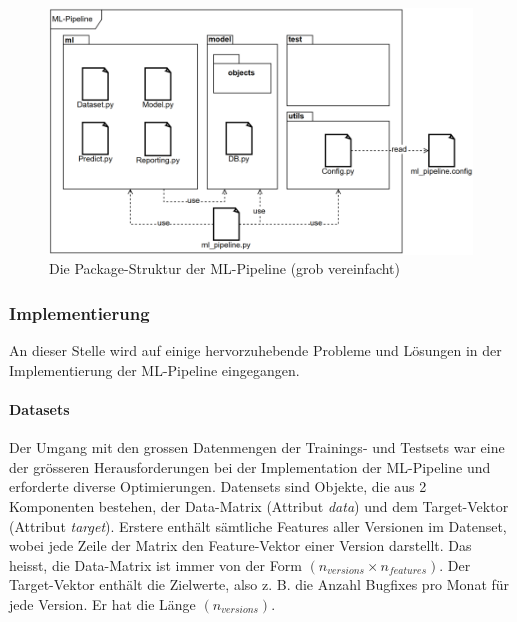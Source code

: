 \documentclass[10pt, a4paper]{article}
\begin{document}
\begin{figure}[h]
	\centering
	\includegraphics[width=1\linewidth]{resources/images/ml_pipeline_packages}
	\caption[Packages der ML-Pipeline]{Die Package-Struktur der ML-Pipeline (grob vereinfacht)}
	\label{fig:ml_pipeline_packages}
\end{figure}

\subsubsection{Implementierung} \label{sec:ml_pipeline_implementation}
An dieser Stelle wird auf einige hervorzuhebende Probleme und Lösungen in der Implementierung der ML-Pipeline eingegangen.

\paragraph{Datasets} Der Umgang mit den grossen Datenmengen der Trainings- und Testsets war eine der grösseren Herausforderungen bei der Implementation der ML-Pipeline und erforderte diverse Optimierungen. Datensets sind Objekte, die aus 2 Komponenten bestehen, der Data-Matrix (Attribut \emph{data}) und dem Target-Vektor (Attribut \emph{target}). Erstere enthält sämtliche Features aller Versionen im Datenset, wobei jede Zeile der Matrix den Feature-Vektor einer Version darstellt. Das heisst, die Data-Matrix ist immer von der Form \((n_{versions} \times n_{features})\). Der Target-Vektor enthält die Zielwerte, also z. B. die Anzahl Bugfixes pro Monat für jede Version. Er hat die Länge \((n_{versions})\).
\end{document}
